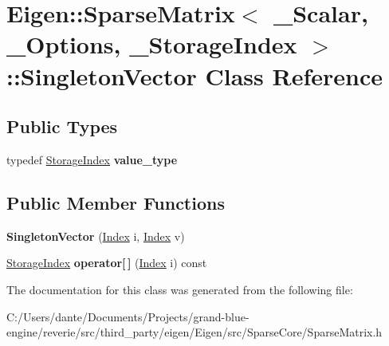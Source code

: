 \hypertarget{class_eigen_1_1_sparse_matrix_1_1_singleton_vector}{}\section{Eigen\+::Sparse\+Matrix$<$ \+\_\+\+Scalar, \+\_\+\+Options, \+\_\+\+Storage\+Index $>$\+::Singleton\+Vector Class Reference}
\label{class_eigen_1_1_sparse_matrix_1_1_singleton_vector}
\subsection*{Public Types}
\begin{DoxyCompactItemize}
\item 
\mbox{\label{class_eigen_1_1_sparse_matrix_1_1_singleton_vector_ac912d690af0c5664bdae85d12bd9151e}} 
typedef \mbox{\hyperlink{class_eigen_1_1_sparse_matrix_base_a0b540ba724726ebe953f8c0df06081ed}{Storage\+Index}} {\bfseries value\+\_\+type}
\end{DoxyCompactItemize}
\subsection*{Public Member Functions}
\begin{DoxyCompactItemize}
\item 
\mbox{\label{class_eigen_1_1_sparse_matrix_1_1_singleton_vector_a99863c3583a12e4d1e7ed06908650218}} 
{\bfseries Singleton\+Vector} (\mbox{\hyperlink{struct_eigen_1_1_eigen_base_a554f30542cc2316add4b1ea0a492ff02}{Index}} i, \mbox{\hyperlink{struct_eigen_1_1_eigen_base_a554f30542cc2316add4b1ea0a492ff02}{Index}} v)
\item 
\mbox{\label{class_eigen_1_1_sparse_matrix_1_1_singleton_vector_abe6509308a32c7b9a5cbc8729ad5e1da}} 
\mbox{\hyperlink{class_eigen_1_1_sparse_matrix_base_a0b540ba724726ebe953f8c0df06081ed}{Storage\+Index}} {\bfseries operator\mbox{[}$\,$\mbox{]}} (\mbox{\hyperlink{struct_eigen_1_1_eigen_base_a554f30542cc2316add4b1ea0a492ff02}{Index}} i) const
\end{DoxyCompactItemize}


The documentation for this class was generated from the following file\+:\begin{DoxyCompactItemize}
\item 
C\+:/\+Users/dante/\+Documents/\+Projects/grand-\/blue-\/engine/reverie/src/third\+\_\+party/eigen/\+Eigen/src/\+Sparse\+Core/Sparse\+Matrix.\+h\end{DoxyCompactItemize}
